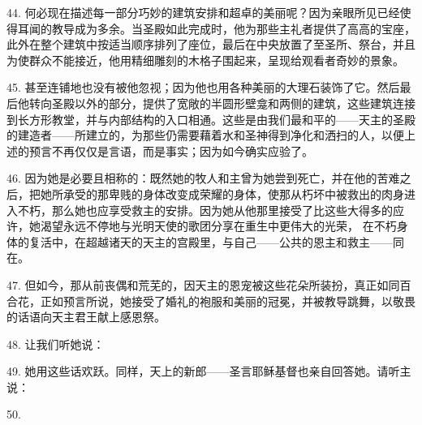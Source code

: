 44. 何必现在描述每一部分巧妙的建筑安排和超卓的美丽呢？因为亲眼所见已经使得耳闻的教导成为多余。当圣殿如此完成时，他为那些主礼者提供了高高的宝座，此外在整个建筑中按适当顺序排列了座位，最后在中央放置了至圣所、祭台，并且为使群众不能接近，他用精细雕刻的木格子围起来，呈现给观看者奇妙的景象。\par

45. 甚至连铺地也没有被他忽视；因为他也用各种美丽的大理石装饰了它。然后最后他转向圣殿以外的部分，提供了宽敞的半圆形壁龛和两侧的建筑，这些建筑连接到长方形教堂，并与内部结构的入口相通。这些是由我们最和平的——天主的圣殿的建造者——所建立的，为那些仍需要藉着水和圣神得到净化和洒扫的人，以便上述的预言不再仅仅是言语，而是事实；因为如今确实应验了。\par

46. 因为她是必要且相称的：既然她的牧人和主曾为她尝到死亡，并在他的苦难之后，把她所承受的那卑贱的身体改变成荣耀的身体，使那从朽坏中被救出的肉身进入不朽，那么她也应享受救主的安排。因为她从他那里接受了比这些大得多的应许，她渴望永远不停地与光明天使的歌团分享在重生中更伟大的光荣， 在不朽身体的复活中，在超越诸天的天主的宫殿里，与自己——公共的恩主和救主——同在。\par

47. 但如今，那从前丧偶和荒芜的，因天主的恩宠被这些花朵所装扮，真正如同百合花，正如预言所说，她接受了婚礼的袍服和美丽的冠冕，并被教导跳舞，以敬畏的话语向天主君王献上感恩祭。\par

48. 让我们听她说：\par

49. 她用这些话欢跃。同样，天上的新郎——圣言耶稣基督也亲自回答她。请听主说：\par

50.  \par


